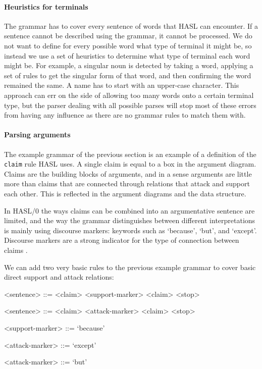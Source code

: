 \paragraph{Heuristics for terminals} The grammar has to cover every sentence of words that HASL can encounter. If a sentence cannot be described using the grammar, it cannot be processed. We do not want to define for every possible word what type of terminal it might be, so instead we use a set of heuristics to determine what type of terminal each word might be. For example, a singular noun is detected by taking a word, applying a set of rules \cite{deSmedtDaelemans2012} to get the singular form of that word, and then confirming the word remained the same. A name has to start with an upper-case character. This approach can err on the side of allowing too many words onto a certain terminal type, but the parser dealing with all possible parses will stop most of these errors from having any influence as there are no grammar rules to match them with.

\paragraph{Parsing arguments} The example grammar of the previous section is an example of a definition of the \texttt{claim} rule HASL uses. A single claim is equal to a box in the argument diagram. Claims are the building blocks of arguments, and in a sense arguments are little more than claims that are connected through relations that attack and support each other. This is reflected in the argument diagrams and the data structure.

In HASL/0 the ways claims can be combined into an argumentative sentence are limited, and the way the grammar distinguishes between different interpretations is mainly using discourse markers: keywords such as `because', `but', and `except'. Discourse markers are a strong indicator for the type of connection between claims \cite{lawrenceReed2015}.

We can add two very basic rules to the previous example grammar to cover basic direct support and attack relations:

\begin{grammar}

<sentence> ::= <claim> <support-marker> <claim> <stop>

<sentence> ::= <claim> <attack-marker> <claim> <stop>

<support-marker> ::= `because'

<attack-marker> ::= `except'

<attack-marker> ::= `but'

\end{grammar}

